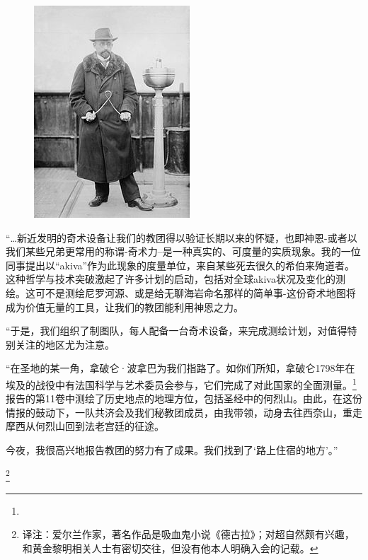 \hr

\begin{figure}[H]
    \centering
    \includegraphics[width=0.5\linewidth]{images/SCP-001-gods-blind-spot-3.jpg}
    \caption*{}
\end{figure}

\begin{scpbox}

“…新近发明的奇术设备让我们的教团得以验证长期以来的怀疑，也即神恩-或者以我们某些兄弟更常用的称谓-奇术力–是一种真实的、可度量的实质现象。我的一位同事提出以“akiva”作为此现象的度量单位，来自某些死去很久的希伯来殉道者。这种哲学与技术突破激起了许多计划的启动，包括对全球akiva状况及变化的测绘。这可不是测绘尼罗河源、或是给无聊海岩命名那样的简单事-这份奇术地图将成为价值无量的工具，让我们的教团能利用神恩之力。

“于是，我们组织了制图队，每人配备一台奇术设备，来完成测绘计划，对值得特别关注的地区尤为注意。

“在圣地的某一角，拿破仑·波拿巴为我们指路了。如你们所知，拿破仑1798年在埃及的战役中有法国科学与艺术委员会参与，它们完成了对此国家的全面测量。\footnote{}报告的第11卷中测绘了历史地点的地理方位，包括圣经中的何烈山。由此，在这份情报的鼓动下，一队共济会及我们秘教团成员，由我带领，动身去往西奈山，重走摩西从何烈山回到法老宫廷的征途。

今夜，我很高兴地报告教团的努力有了成果。我们找到了‘路上住宿的地方’。”

\footnote{译注：爱尔兰作家，著名作品是吸血鬼小说《德古拉》；对超自然颇有兴趣，和黄金黎明相关人士有密切交往，但没有他本人明确入会的记载。}

\end{scpbox}

